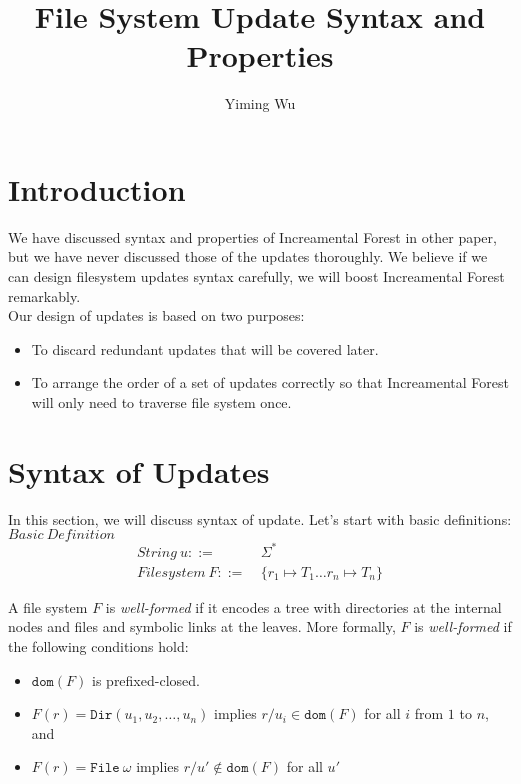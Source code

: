 \documentclass[10pt,twoside,a4paper]{article}
\title{File System Update Syntax and Properties}
\author{Yiming Wu}
\theoremstyle{theorem}
\theoremstyle{lemma}
\theoremstyle{property}
\theoremstyle{definition}
\theoremstyle{assumption}
\begin{document}
\maketitle

\section{Introduction}
We have discussed syntax and properties of Increamental Forest in other paper, but we have never discussed those of the updates thoroughly.
We believe if we can design filesystem updates syntax carefully, we will boost Increamental Forest remarkably.\\

Our design of updates is based on two purposes:
\begin{itemize}
\item To discard redundant updates that will be covered later.
\item To arrange the order of a set of updates correctly so that Increamental Forest will only need to traverse file system once.
\end{itemize}

\section{Syntax of Updates}
In this section, we will discuss syntax of update. Let's start with basic definitions:\\


$\boxed{Basic~Definition}$
\begin{align*}
	String ~u ::= & ~\Sigma^\ast \\ 
	Filesystem ~F ::= & ~\{r_1 \mapsto T_1 \dots r_n \mapsto T_n\}
\end{align*}

A file system $F$ is \emph{well-formed} if it encodes a tree with directories at the internal nodes and files and symbolic links at the leaves. More formally, $F$ is \emph{well-formed} if the following conditions hold:

\begin{itemize}
	\item $\mathtt{dom}(F)$ is prefixed-closed.
	\item $F(r) = \mathtt{Dir}(u_1,u_2,\dots,u_n)$ implies $r/u_i \in \mathtt{dom}(F)$ for all $i$ from $1$ to $n$, and
	\item $F(r) = \mathtt{File}~\omega$ implies $r/u' \notin \mathtt{dom}(F)$ for all $u'$
\end{itemize}
\end{document}

